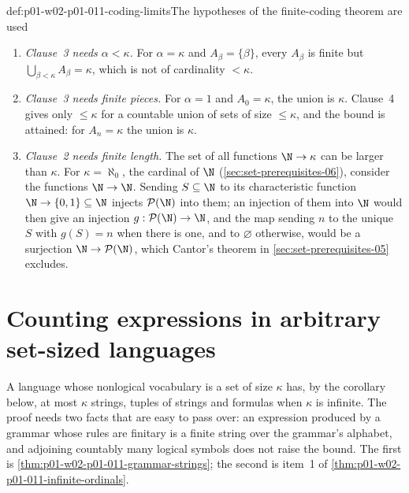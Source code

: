 \begin{hbwarning}{def:p01-w02-p01-011-coding-limits}{The hypotheses of the finite-coding theorem are used}
\begin{enumerate}
  \item \emph{Clause~3 needs \(\alpha<\kappa\).} For \(\alpha=\kappa\) and
        \(A_\beta=\{\beta\}\), every \(A_\beta\) is finite but
        \(\bigcup_{\beta<\kappa}A_\beta=\kappa\), which is not of
        cardinality \({<}\kappa\).
  \item \emph{Clause~3 needs finite pieces.} For \(\alpha=1\) and
        \(A_0=\kappa\), the union is \(\kappa\). Clause~4 gives only
        \(\leq\kappa\) for a countable union of sets of size
        \(\leq\kappa\), and the bound is attained: for \(A_n=\kappa\) the
        union is \(\kappa\).
  \item \emph{Clause~2 needs finite length.} The set of all functions
        \(\N\to\kappa\) can be larger than \(\kappa\). For
        \(\kappa=\aleph_0\), the cardinal of \(\N\)
        (\cref{sec:set-prerequisites-06}), consider the functions
        \(\N\to\N\). Sending \(S\subseteq\N\) to its characteristic function
        \(\N\to\{0,1\}\subseteq\N\) injects \(\mathcal P(\N)\) into them; an
        injection of them into \(\N\) would then give an injection
        \(g:\mathcal P(\N)\to\N\), and the map sending \(n\) to the unique \(S\)
        with \(g(S)=n\) when there is one, and to \(\varnothing\) otherwise,
        would be a surjection \(\N\to\mathcal P(\N)\), which Cantor's theorem in
        \cref{sec:set-prerequisites-05} excludes.
\end{enumerate}
\end{hbwarning}

\section{Counting expressions in arbitrary set-sized languages}
\label{sec:p01-w02-p01-011-syntax-counting}

A language whose nonlogical vocabulary is a set of size \(\kappa\) has, by
the corollary below, at most \(\kappa\) strings, tuples of strings and
formulas when \(\kappa\) is infinite. The proof needs two facts that are easy
to pass over: an expression produced by a grammar whose rules are finitary is
a finite string over the grammar's alphabet, and adjoining countably many
logical symbols does not raise the bound. The first is
\cref{thm:p01-w02-p01-011-grammar-strings}; the second is item~1 of
\cref{thm:p01-w02-p01-011-infinite-ordinals}.

